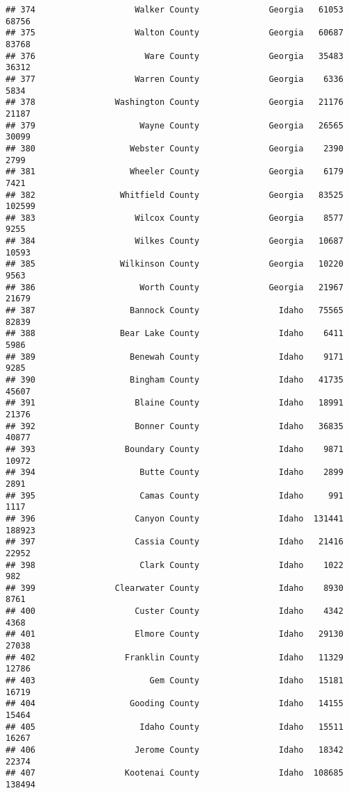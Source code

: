 \documentclass[
]{article}
\begin{document}
\begin{verbatim}
## 374                    Walker County              Georgia   61053   68756
## 375                    Walton County              Georgia   60687   83768
## 376                      Ware County              Georgia   35483   36312
## 377                    Warren County              Georgia    6336    5834
## 378                Washington County              Georgia   21176   21187
## 379                     Wayne County              Georgia   26565   30099
## 380                   Webster County              Georgia    2390    2799
## 381                   Wheeler County              Georgia    6179    7421
## 382                 Whitfield County              Georgia   83525  102599
## 383                    Wilcox County              Georgia    8577    9255
## 384                    Wilkes County              Georgia   10687   10593
## 385                 Wilkinson County              Georgia   10220    9563
## 386                     Worth County              Georgia   21967   21679
## 387                   Bannock County                Idaho   75565   82839
## 388                 Bear Lake County                Idaho    6411    5986
## 389                   Benewah County                Idaho    9171    9285
## 390                   Bingham County                Idaho   41735   45607
## 391                    Blaine County                Idaho   18991   21376
## 392                    Bonner County                Idaho   36835   40877
## 393                  Boundary County                Idaho    9871   10972
## 394                     Butte County                Idaho    2899    2891
## 395                     Camas County                Idaho     991    1117
## 396                    Canyon County                Idaho  131441  188923
## 397                    Cassia County                Idaho   21416   22952
## 398                     Clark County                Idaho    1022     982
## 399                Clearwater County                Idaho    8930    8761
## 400                    Custer County                Idaho    4342    4368
## 401                    Elmore County                Idaho   29130   27038
## 402                  Franklin County                Idaho   11329   12786
## 403                       Gem County                Idaho   15181   16719
## 404                   Gooding County                Idaho   14155   15464
## 405                     Idaho County                Idaho   15511   16267
## 406                    Jerome County                Idaho   18342   22374
## 407                  Kootenai County                Idaho  108685  138494

\end{verbatim}
\end{document}
